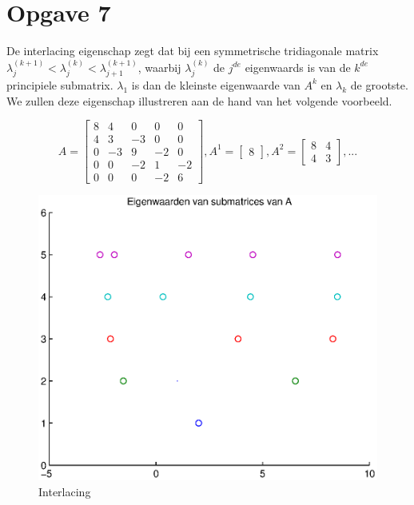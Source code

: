 \documentclass[]{article}
\newcommand{\opgave}[1]{\section*{Opgave #1}}
\begin{document}
\opgave7


De interlacing eigenschap zegt dat bij een symmetrische tridiagonale matrix $\lambda ^{(k+1)}_{j} < \lambda ^{(k)}_{j} < \lambda ^{(k+1)}_{j+1}$, waarbij $\lambda ^{(k)}_{j}$ de $j^{de}$ eigenwaards is van de $k^{de}$ principiele submatrix. $\lambda _{1}$ is dan de kleinste eigenwaarde van $A^{k}$ en $\lambda _{k}$ de grootste. We zullen deze eigenschap illustreren aan de hand van het volgende voorbeeld.

\begin{equation}
A=\begin{bmatrix}
    	8 & 4 & 0 & 0 & 0	\\
    	4 & 3 & -3 & 0 & 0 \\
    	0 & -3 & 9 & -2 & 0 \\
    	0 & 0 & -2 & 1 & -2 \\
    	0 & 0 & 0 & -2 & 6 
    \end{bmatrix}
    ,
    A^{1}=\begin{bmatrix}
        	8
        \end{bmatrix}
        ,
    A^{2}=\begin{bmatrix}
           	8 & 4 \\
           	4 & 3
         \end{bmatrix}
         , ...
\end{equation}
\begin{figure}
\noindent \includegraphics[width=1\linewidth]{opgave7.eps}
\caption{Interlacing}
\label{figuurtje}
\end{figure}
\end{document}
